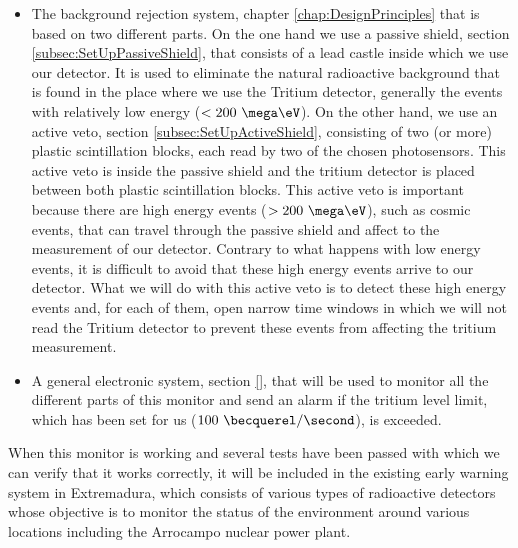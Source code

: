 \begin{itemize}
\item{} The background rejection system, chapter \ref{chap:DesignPrinciples} that is based on two different parts. On the one hand we use a passive shield, section \ref{subsec:SetUpPassiveShield}, that consists of a lead castle inside which we use our detector. It is used to eliminate the natural radioactive background that is found in the place where we use the Tritium detector, generally the events with relatively low energy ($<200~\mega\eV$). On the other hand, we use an active veto, section \ref{subsec:SetUpActiveShield}, consisting of two (or more) plastic scintillation blocks, each read by two of the chosen photosensors. This active veto is inside the passive shield and the tritium detector is placed between both plastic scintillation blocks. This active veto is important because there are high energy events ($>200~\mega\eV$), such as cosmic events, that can travel through the passive shield and affect to the measurement of our detector. Contrary to what happens with low energy events, it is difficult to avoid that these high energy events arrive to our detector. What we will do with this active veto is to detect these high energy events and, for each of them, open narrow time windows in which we will not read the Tritium detector to prevent these events from affecting the tritium measurement.

\item{} A general electronic system, section \ref{}, that will be used to monitor all the different parts of this monitor and send an alarm if the tritium level limit, which has been set for us ($100~\becquerel/\second$), is exceeded.

\end{itemize}

When this monitor is working and several tests have been passed with which we can verify that it works correctly, it will be included in the existing early warning system in Extremadura, which consists of various types of radioactive detectors whose objective is to monitor the status of the environment around various locations including the Arrocampo nuclear power plant.